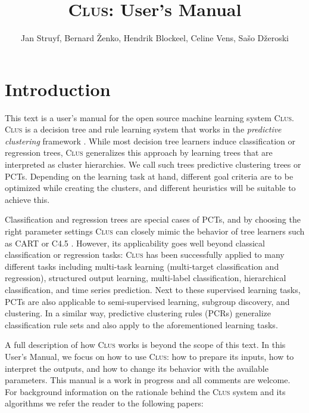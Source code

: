 \documentclass[a4paper]{report}
\newcommand{\clus}{\textsc{Clus}}
\begin{document}
\title{\clus: User's Manual}

\author{Jan Struyf, Bernard \v{Z}enko, Hendrik Blockeel, Celine Vens, Sa\v{s}o D\v{z}eroski}

\maketitle



\tableofcontents


\chapter{Introduction}

This text is a user's manual for the open source machine learning system \clus{}. \clus{} is a decision tree and rule learning system that works in the \emph{predictive clustering} framework \cite{Blockeel1998icml}.
While most decision tree learners induce classification or regression trees, \clus{} generalizes this approach by learning trees that are interpreted as cluster hierarchies. We call such trees predictive clustering trees or PCTs. Depending on the learning task at hand, different goal criteria are to be optimized while creating the clusters, and different heuristics will be suitable to achieve this.

Classification and regression trees are special cases of PCTs, and by choosing the right parameter settings \clus{} can closely mimic the behavior of tree learners such as CART \cite{Breiman1984} or C4.5 \cite{Quinlan1993}.  However, its applicability goes well beyond classical classification or regression tasks: \clus{} has been successfully applied to many different tasks including multi-task learning (multi-target classification and regression), structured output learning, multi-label classification, hierarchical classification, and time series prediction. Next to these supervised learning tasks, PCTs are also applicable to semi-supervised learning, subgroup discovery, and clustering.
%
In a similar way, predictive clustering rules (PCRs) generalize classification rule sets \cite{Clark91:proc} and also apply to the aforementioned learning tasks.

A full description of how \clus{} works is beyond the scope of this text. In this User's Manual, we focus on how to use \clus{}: how to prepare its inputs, how to interpret the outputs, and how to change its behavior with the available parameters. This manual is a work in progress and all comments are welcome.
%
For background information on the rationale behind the \clus{} system and its algorithms we refer the reader to the following papers:
\end{document}

